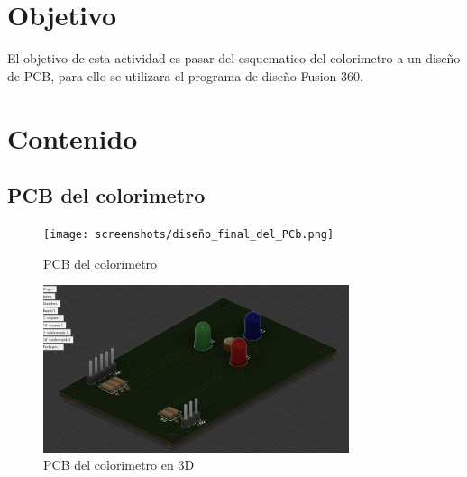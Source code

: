 \documentclass[12pt]{report}
\begin{document}
\chapter*{Objetivo}
El objetivo de esta actividad es pasar del esquematico del colorimetro a un diseño de PCB, para ello se utilizara el programa de diseño Fusion 360.
\newpage

\chapter{Contenido}
\section{PCB del colorimetro}
\begin{figure}[H]
    \centering
    \texttt{[image: screenshots/diseño\_final\_del\_PCb.png]}
    \caption{PCB del colorimetro}
    \label{fig:colorimetro}
\end{figure}
\begin{figure}[H]
    \centering
    \includegraphics[width=0.8\textwidth]{screenshots/pcb3D.png}
    \caption{PCB del colorimetro en 3D}
    \label{fig:PCB}
\end{figure}




\newpage
\end{document}

